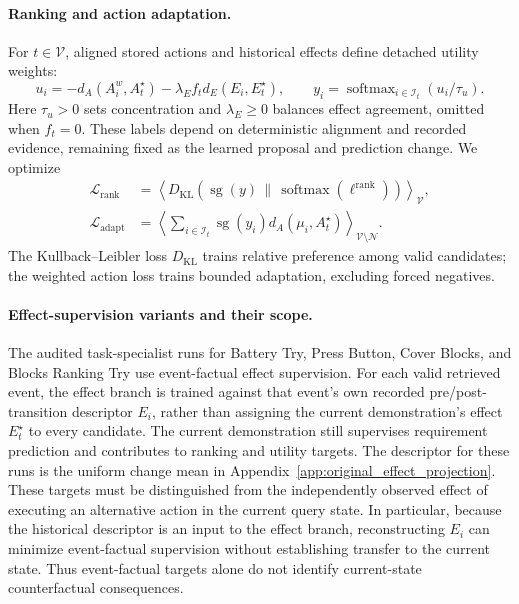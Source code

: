 \paragraph{Ranking and action adaptation.}
For $t\in\mathcal V$, aligned stored actions and historical effects define detached utility weights:
\begin{equation}
 u_i=-d_A(A_i^w,A_t^\star)-\lambda_E f_t d_E(E_i,E_t^\star),\qquad
 y_i=\operatorname{softmax}_{i\in\mathcal I_t}(u_i/\tau_u).
 \label{eq:utility}
\end{equation}
Here $\tau_u>0$ sets concentration and $\lambda_E\geq0$ balances effect agreement, omitted when $f_t=0$.
These labels depend on deterministic alignment and recorded evidence, remaining fixed as the learned proposal and prediction change.
We optimize
\begin{equation}
 \begin{aligned}
 \mathcal L_{\mathrm{rank}}&=\left\langle D_{\mathrm{KL}}\!\left(
 \operatorname{sg}(y)\,\|\,\operatorname{softmax}(\ell^{\mathrm{rank}})\right)\right\rangle_{\mathcal V},\\
 \mathcal L_{\mathrm{adapt}}&=\left\langle\sum_{i\in\mathcal I_t}
 \operatorname{sg}(y_i)d_A(\mu_i,A_t^\star)\right\rangle_{\mathcal V\setminus\mathcal N}.
 \end{aligned}
 \label{eq:ranking_adaptation}
\end{equation}
The Kullback--Leibler loss $D_{\mathrm{KL}}$ trains relative preference among valid candidates; the weighted action loss trains bounded adaptation, excluding forced negatives.

\paragraph{Effect-supervision variants and their scope.}
\label{app:effect_target_scope}
The audited task-specialist runs for Battery Try, Press Button, Cover Blocks, and Blocks Ranking Try use event-factual effect supervision.
For each valid retrieved event, the effect branch is trained against that event's own recorded pre/post-transition descriptor $E_i$, rather than assigning the current demonstration's effect $E_t^\star$ to every candidate.
The current demonstration still supervises requirement prediction and contributes to ranking and utility targets. The descriptor for these runs is the uniform change mean in Appendix~\ref{app:original_effect_projection}.
These targets must be distinguished from the independently observed effect of executing an alternative action in the current query state.
In particular, because the historical descriptor is an input to the effect branch, reconstructing $E_i$ can minimize event-factual supervision without establishing transfer to the current state.
Thus event-factual targets alone do not identify current-state counterfactual consequences.


